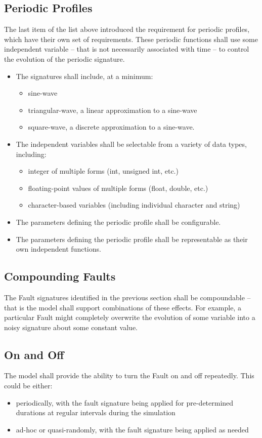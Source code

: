 \documentclass[11pt,fleqn]{report}
\begin{document}
\subsection {Periodic Profiles}
 The last item of the list above introduced the requirement for periodic
 profiles, which have their own set of requirements.
 These periodic functions shall use some independent variable -- that is not
 necessarily associated with time -- to
 control the evolution of the periodic signature.
\begin{itemize}
 \item The signatures shall include, at a minimum:
  \begin{itemize}
   \item sine-wave
   \item triangular-wave, a linear approximation to a sine-wave
   \item square-wave, a discrete approximation to a sine-wave.
  \end{itemize}
 \item The independent variables shall be selectable from a variety of data
       types, including:
  \begin{itemize}
   \item integer of multiple forms (int, unsigned int, etc.)
   \item floating-point values of multiple forms (float, double, etc.)
   \item character-based variables (including individual character and string)
  \end{itemize}
 \item The parameters defining the periodic profile shall be configurable.
 \item The parameters defining the periodic profile shall be representable as
       their own independent functions.
\end{itemize}

\subsection{Compounding Faults}
The Fault signatures identified in the previous section shall be compoundable --
that is the model shall support combinations of these effects. For example, a
particular Fault might completely overwrite the evolution of some variable into
a noisy signature about some constant value.

\subsection {On and Off}
The model shall provide the ability to turn the Fault on and off repeatedly.
This could be either:
\begin{itemize}
 \item periodically, with the fault signature being applied for pre-determined
 durations at regular intervals during the simulation
 \item ad-hoc or quasi-randomly, with the fault signature being applied as
 needed
\end{itemize}
\end{document}

